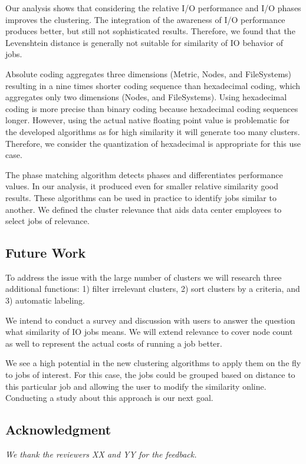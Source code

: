 \documentclass{jhps}
\begin{document}
{{{{Our analysis shows that considering the relative I/O performance and I/O phases improves the clustering.
The integration of the awareness of I/O performance produces better, but still not sophisticated results.
Therefore, we found that the Levenshtein distance is generally not suitable for similarity of IO behavior of jobs.

Absolute coding aggregates three dimensions (Metric, Nodes, and FileSystems) resulting in a nine times shorter coding sequence than hexadecimal coding, which aggregates only two dimensions (Nodes, and FileSystems).
Using hexadecimal coding is more precise than binary coding because hexadecimal coding sequences longer.
However, using the actual native floating point value is problematic for the developed algorithms as for high similarity it will generate too many clusters.
Therefore, we consider the quantization of hexadecimal is appropriate for this use case.

The phase matching algorithm detects phases and differentiates performance values.
In our analysis, it produced even for smaller relative similarity good results.
These algorithms can be used in practice to identify jobs similar to another.
We defined the cluster relevance that aids data center employees to select jobs of relevance.


\subsection{Future Work}
To address the issue with the large number of clusters we will research three additional functions: 1) filter irrelevant clusters, 2) sort clusters by a criteria, and 3) automatic labeling.

We intend to conduct a survey and discussion with users to answer the question what similarity of IO jobs means.
We will extend relevance to cover node count as well to represent the actual costs of running a job better.

We see a high potential in the new clustering algorithms to apply them on the fly to jobs of interest.
For this case, the jobs could be grouped based on distance to this particular job and allowing the user to modify the similarity online.
Conducting a study about this approach is our next goal.


\subsection*{Acknowledgment} %
\textit{We thank the reviewers XX and YY for the feedback.}

}}}}
\end{document}
